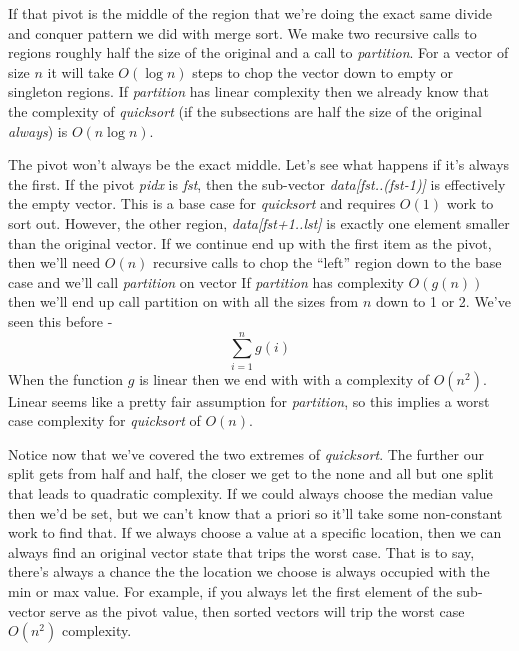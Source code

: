\documentclass[]{tufte-handout}
\begin{document}
If that pivot is the middle of the region that we're doing the exact same divide and conquer pattern we did with merge sort. We make two recursive calls to regions roughly half the size of the original and a call to \textit{partition}. For a vector of size $n$ it will take  $O(\log n)$ steps to chop the vector down to empty or singleton regions. If \textit{partition} has linear complexity then we already know that the complexity of \textit{quicksort} (if the subsections are half the size of the original \textit{always}) is $O(n\log n)$. 

The pivot won't always be the exact middle. Let's see what happens if it's always the first. If the pivot \textit{pidx} is \textit{fst}, then the sub-vector \textit{data[fst..(fst-1)]} is effectively the empty vector. This is a base case for \textit{quicksort} and requires $O(1)$ work to sort out. However, the other region, \textit{data[fst+1..lst]} is exactly one element smaller than the original vector. If we continue end up with the first item as the pivot, then we'll need $O(n)$ recursive calls to chop the ``left'' region down to the base case and we'll call \textit{partition} on vector If \textit{partition} has complexity $O(g(n))$ then we'll end up call partition on with all the sizes from $n$ down to 1 or 2. We've seen this before - 
\[	
\sum\limits_{i=1}^{n} g(i)
\]
When the function $g$ is linear then we end with with a complexity of $O(n^2)$. Linear seems like a pretty fair assumption for \textit{partition}, so this implies a worst case complexity for \textit{quicksort} of $O(n)$.  

Notice now that we've covered the two extremes of \textit{quicksort}. The further our split gets from half and half, the closer we get to the none and all but one split that leads to quadratic complexity. If we could always choose the median value then we'd be set, but we can't know that a priori so it'll take some non-constant work to find that. If we always choose a value at a specific location, then we can always find an original vector state that trips the worst case.  That is to say, there's always a chance the the location we choose is always occupied with the min or max value.  For example, if you always let the first element of the sub-vector serve as the pivot value, then sorted vectors will trip the worst case $O(n^2)$ complexity. 
\end{document}
